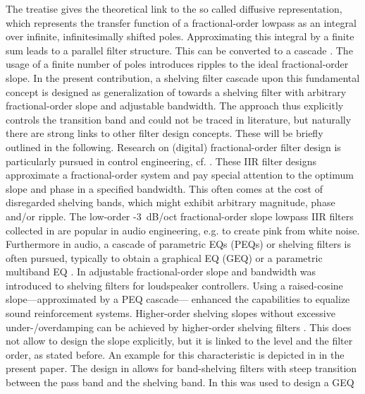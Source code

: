 The treatise gives the theoretical link to the so called diffusive
representation, which represents the transfer function of
a fractional-order lowpass as an integral over infinite,
infinitesimally shifted poles.
%
Approximating this integral by a finite sum leads to a parallel filter
structure.
%
This can be converted to a cascade \cite{Liski2019IEEE}.
%
The usage of a finite number of poles introduces ripples to the ideal
fractional-order slope.
%
In the present contribution, a shelving filter cascade upon this
fundamental concept is designed as generalization of \cite{Schultz2016}
towards a shelving filter with arbitrary fractional-order
slope and adjustable bandwidth.
%
The approach thus explicitly controls the transition band
and could not be traced in literature, but naturally there
are strong links to other filter design concepts.
%
These will be briefly outlined in the following.
%
%
%
\NewL Research on (digital) fractional-order filter design is particularly
pursued in control engineering, cf.
\cite{Chen2003,Barbosa2005,Barbosa2006,Tseng2017}.
%
These IIR filter designs approximate a fractional-order system and pay
special attention to the optimum slope and phase in a specified bandwidth.
%
This often comes at the cost of disregarded shelving bands, which might exhibit
arbitrary magnitude, phase and/or ripple.
%
The low-order -3~dB/oct fractional-order slope lowpass IIR filters
collected in \cite{Whittle2011} are popular in audio engineering,
e.g. to create pink from white noise.
%
%
%
\NewL Furthermore in audio, a cascade of parametric EQs (PEQs) or
shelving filters is often pursued, typically to obtain a
graphical EQ (GEQ) \cite{Holters2006b,Valimaki2017} or a
parametric multiband EQ \cite{McGrath2004,Eastty2008,Eastty2015,Lorente2017}.
%
%
In \cite{McGrath2004} adjustable fractional-order slope and bandwidth
was introduced to shelving filters for loudspeaker
controllers.
%
Using a raised-cosine slope---approximated by a PEQ cascade---%
enhanced the capabilities to equalize sound reinforcement systems.
%
Higher-order shelving slopes without excessive under-/overdamping can be
achieved by higher-order shelving filters \cite{Holters2006a}.
%
This does not allow to design the slope explicitly, but it is linked
to the level and the filter order, as stated before.
%
An example for this characteristic is depicted in
 in the present paper.
%
The design in \cite{Holters2006a} allows for
band-shelving filters with steep transition between the pass band and the
shelving band.
%
In \cite{Holters2006b} this was used to design a GEQ
